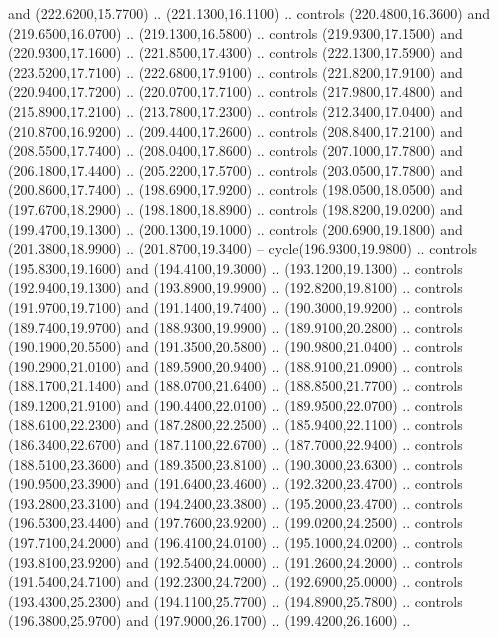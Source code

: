 {\begin{scope}[y=0.80pt, x=0.80pt, yscale=-1, xscale=1, inner sep=0pt, outer sep=0pt, #1]
      and (222.6200,15.7700) .. (221.1300,16.1100) .. controls (220.4800,16.3600)
      and (219.6500,16.0700) .. (219.1300,16.5800) .. controls (219.9300,17.1500)
      and (220.9300,17.1600) .. (221.8500,17.4300) .. controls (222.1300,17.5900)
      and (223.5200,17.7100) .. (222.6800,17.9100) .. controls (221.8200,17.9100)
      and (220.9400,17.7200) .. (220.0700,17.7100) .. controls (217.9800,17.4800)
      and (215.8900,17.2100) .. (213.7800,17.2300) .. controls (212.3400,17.0400)
      and (210.8700,16.9200) .. (209.4400,17.2600) .. controls (208.8400,17.2100)
      and (208.5500,17.7400) .. (208.0400,17.8600) .. controls (207.1000,17.7800)
      and (206.1800,17.4400) .. (205.2200,17.5700) .. controls (203.0500,17.7800)
      and (200.8600,17.7400) .. (198.6900,17.9200) .. controls (198.0500,18.0500)
      and (197.6700,18.2900) .. (198.1800,18.8900) .. controls (198.8200,19.0200)
      and (199.4700,19.1300) .. (200.1300,19.1000) .. controls (200.6900,19.1800)
      and (201.3800,18.9900) .. (201.8700,19.3400) -- cycle(196.9300,19.9800) ..
      controls (195.8300,19.1600) and (194.4100,19.3000) .. (193.1200,19.1300) ..
      controls (192.9400,19.1300) and (193.8900,19.9900) .. (192.8200,19.8100) ..
      controls (191.9700,19.7100) and (191.1400,19.7400) .. (190.3000,19.9200) ..
      controls (189.7400,19.9700) and (188.9300,19.9900) .. (189.9100,20.2800) ..
      controls (190.1900,20.5500) and (191.3500,20.5800) .. (190.9800,21.0400) ..
      controls (190.2900,21.0100) and (189.5900,20.9400) .. (188.9100,21.0900) ..
      controls (188.1700,21.1400) and (188.0700,21.6400) .. (188.8500,21.7700) ..
      controls (189.1200,21.9100) and (190.4400,22.0100) .. (189.9500,22.0700) ..
      controls (188.6100,22.2300) and (187.2800,22.2500) .. (185.9400,22.1100) ..
      controls (186.3400,22.6700) and (187.1100,22.6700) .. (187.7000,22.9400) ..
      controls (188.5100,23.3600) and (189.3500,23.8100) .. (190.3000,23.6300) ..
      controls (190.9500,23.3900) and (191.6400,23.4600) .. (192.3200,23.4700) ..
      controls (193.2800,23.3100) and (194.2400,23.3800) .. (195.2000,23.4700) ..
      controls (196.5300,23.4400) and (197.7600,23.9200) .. (199.0200,24.2500) ..
      controls (197.7100,24.2000) and (196.4100,24.0100) .. (195.1000,24.0200) ..
      controls (193.8100,23.9200) and (192.5400,24.0000) .. (191.2600,24.2000) ..
      controls (191.5400,24.7100) and (192.2300,24.7200) .. (192.6900,25.0000) ..
      controls (193.4300,25.2300) and (194.1100,25.7700) .. (194.8900,25.7800) ..
      controls (196.3800,25.9700) and (197.9000,26.1700) .. (199.4200,26.1600) ..

\end{scope}}
